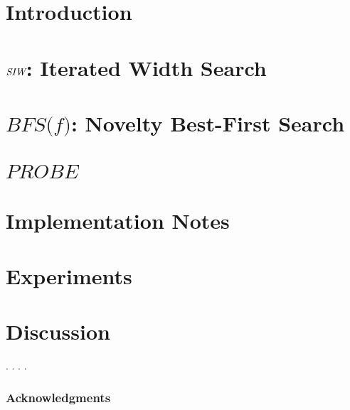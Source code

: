 \documentclass[letterpaper]{article}
\begin{document}
\section{Introduction}


\section{${\textit{SIW}}$: Iterated Width Search}


\section{$\textit{BFS(f)}$: Novelty Best-First Search}


\section{$\textit{PROBE}$}


\section{Implementation Notes}



\section{Experiments}


\section{Discussion}

.
.
.
.

\subsubsection{Acknowledgments}




\end{document}
